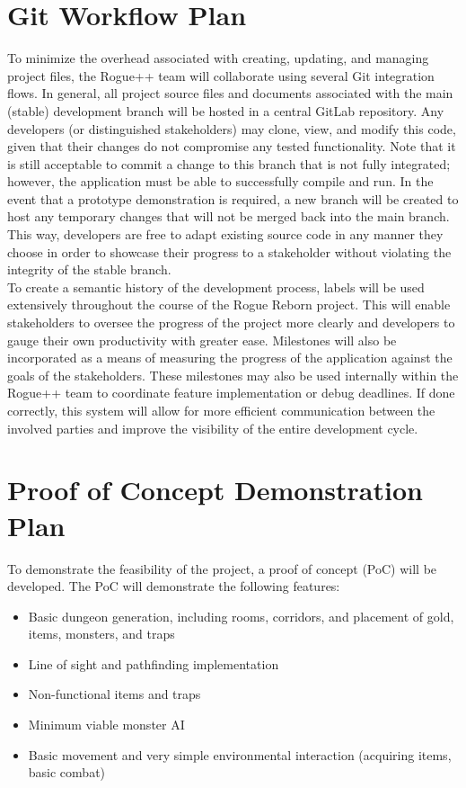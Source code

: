 \documentclass{article}
\begin{document}
\section{Git Workflow Plan}
\label{workflow_label}

\indent
To minimize the overhead associated with creating, updating, and managing project files, the Rogue++ team will collaborate using several Git integration flows.  In general, all project source files and documents associated with the main (stable) development branch will be hosted in a central GitLab repository.  Any developers (or distinguished stakeholders) may clone, view, and modify this code, given that their changes do not compromise any tested functionality.  Note that it is still acceptable to commit a change to this branch that is not fully integrated; however, the application must be able to successfully compile and run.  In the event that a prototype demonstration is required, a new branch will be created to host any temporary changes that will not be merged back into the main branch.  This way, developers are free to adapt existing source code in any manner they choose in order to showcase their progress to a stakeholder without violating the integrity of the stable branch.\\

To create a semantic history of the development process, labels will be used extensively throughout the course of the Rogue Reborn project.  This will enable stakeholders to oversee the progress of the project more clearly and developers to gauge their own productivity with greater ease.  Milestones will also be incorporated as a means of measuring the progress of the application against the goals of the stakeholders.  These milestones may also be used internally within the Rogue++ team to coordinate feature implementation or debug deadlines. If done correctly, this system will allow for more efficient communication between the involved parties and improve the visibility of the entire development cycle.

\section{Proof of Concept Demonstration Plan}
\label{poc_label}

\indent
To demonstrate the feasibility of the project, a proof of concept (PoC) will be developed. The PoC will demonstrate the following features:

\begin{itemize}
	\item Basic dungeon generation, including rooms, corridors, and placement of gold, items, monsters, and traps
	\item Line of sight and pathfinding implementation
	\item Non-functional items and traps
	\item Minimum viable monster AI
	\item Basic movement and very simple environmental interaction (acquiring items, basic combat)
\end{itemize}
\end{document}
